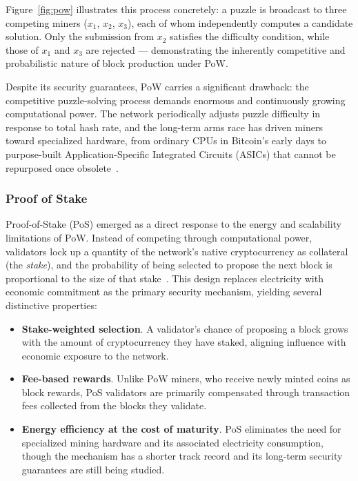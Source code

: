 Figure~\ref{fig:pow} illustrates this process concretely: a puzzle is broadcast to three competing miners ($x_1$, $x_2$, $x_3$), each of whom independently computes a candidate solution. Only the submission from $x_2$ satisfies the difficulty condition, while those of $x_1$ and $x_3$ are rejected --- demonstrating the inherently competitive and probabilistic nature of block production under PoW.

Despite its security guarantees, PoW carries a significant drawback: the competitive puzzle-solving process demands enormous and continuously growing computational power. The network periodically adjusts puzzle difficulty in response to total hash rate, and the long-term arms race has driven miners toward specialized hardware, from ordinary CPUs in Bitcoin's early days to purpose-built Application-Specific Integrated Circuits (ASICs) that cannot be repurposed once obsolete~\cite{SCHINCKUS2021111682}.

\subsubsection*{Proof of Stake}
Proof-of-Stake (PoS) emerged as a direct response to the energy and scalability limitations of PoW. Instead of competing through computational power, validators lock up a quantity of the network's native cryptocurrency as collateral (the \emph{stake}), and the probability of being selected to propose the next block is proportional to the size of that stake~\cite{nguyen2019pos}. This design replaces electricity with economic commitment as the primary security mechanism, yielding several distinctive properties:
\begin{itemize}
    \item \textbf{Stake-weighted selection}. A validator's chance of proposing a block grows with the amount of cryptocurrency they have staked, aligning influence with economic exposure to the network.
    \item \textbf{Fee-based rewards}. Unlike PoW miners, who receive newly minted coins as block rewards, PoS validators are primarily compensated through transaction fees collected from the blocks they validate.
    \item \textbf{Energy efficiency at the cost of maturity}. PoS eliminates the need for specialized mining hardware and its associated electricity consumption, though the mechanism has a shorter track record and its long-term security guarantees are still being studied.
\end{itemize}

